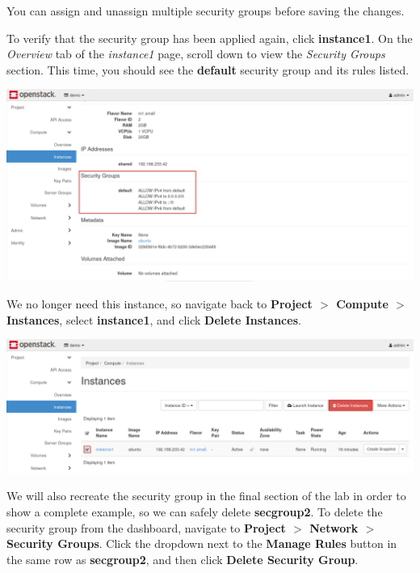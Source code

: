 \documentclass[letterpaper, 12pt]{article}
\begin{document}
\begin{enumerate}
    \begin{tipbox}
        You can assign and unassign multiple security groups before saving the changes.
    \end{tipbox}

    \begin{labstep}
        To verify that the security group has been applied again, click \textbf{instance1}.
        On the \textit{Overview} tab of the \textit{instance1} page, scroll down to view the \textit{Security Groups} section.
        This time, you should see the \textbf{default} security group and its rules listed.

        \begin{center}
            \includegraphics[width=\linewidth]{images/part2/step21.png}
        \end{center}
    \end{labstep}

    \begin{labstep}
        We no longer need this instance, so navigate back to \textbf{Project $>$ Compute $>$ Instances}, select \textbf{instance1}, and click \textbf{Delete Instances}.

        \begin{center}
            \includegraphics[width=\linewidth]{images/part2/step22.png}
        \end{center}
    \end{labstep}

    \begin{labstep}
        We will also recreate the security group in the final section of the lab in order to show a complete example, so we can safely delete \textbf{secgroup2}.
        To delete the security group from the dashboard, navigate to \textbf{Project $>$ Network $>$ Security Groups}.
        Click the dropdown next to the \textbf{Manage Rules} button in the same row as \textbf{secgroup2}, and then click \textbf{Delete Security Group}.


\end{labstep}
\end{enumerate}
\end{document}
